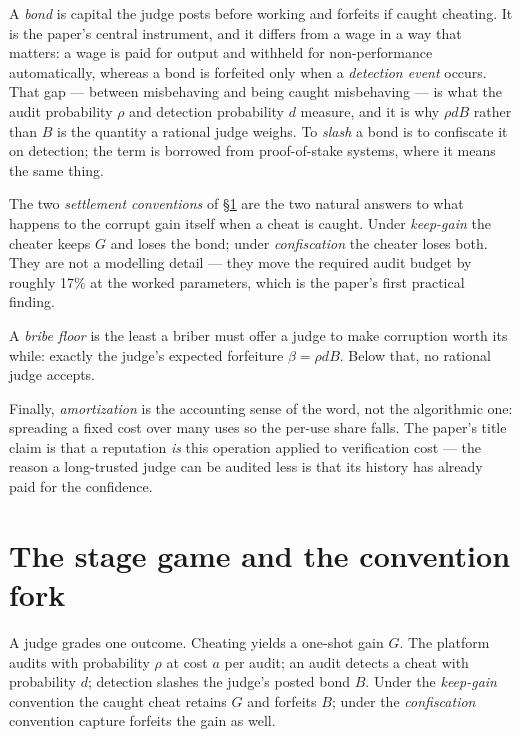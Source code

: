 \documentclass[11pt,a4paper]{article}
\begin{document}
A \emph{bond} is capital the judge posts before working and forfeits if caught cheating. It is the paper's central
instrument, and it differs from a wage in a way that matters: a wage is paid for output and withheld for non-performance
automatically, whereas a bond is forfeited only when a \emph{detection event} occurs. That gap --- between misbehaving and
being caught misbehaving --- is what the audit probability $\rho$ and detection probability $d$ measure, and it is why
$\rho d B$ rather than $B$ is the quantity a rational judge weighs. To \emph{slash} a bond is to confiscate it on
detection; the term is borrowed from proof-of-stake systems, where it means the same thing.

The two \emph{settlement conventions} of \S\ref{sec:stage} are the two natural answers to what happens to the corrupt gain
itself when a cheat is caught. Under \emph{keep-gain} the cheater keeps $G$ and loses the bond; under \emph{confiscation}
the cheater loses both. They are not a modelling detail --- they move the required audit budget by roughly 17\% at the
worked parameters, which is the paper's first practical finding.

A \emph{bribe floor} is the least a briber must offer a judge to make corruption worth its while: exactly the judge's
expected forfeiture $\beta = \rho d B$. Below that, no rational judge accepts.

Finally, \emph{amortization} is the accounting sense of the word, not the algorithmic one: spreading a fixed cost over many
uses so the per-use share falls. The paper's title claim is that a reputation \emph{is} this operation applied to
verification cost --- the reason a long-trusted judge can be audited less is that its history has already paid for the
confidence.

\section{The stage game and the convention fork}\label{sec:stage}
A judge grades one outcome. Cheating yields a one-shot gain $G$. The platform audits with probability $\rho$ at cost $a$ per audit; an audit detects a cheat with probability $d$; detection slashes the judge's posted bond $B$. Under the \emph{keep-gain} convention the caught cheat retains $G$ and forfeits $B$; under the \emph{confiscation} convention capture forfeits the gain as well.
\end{document}
